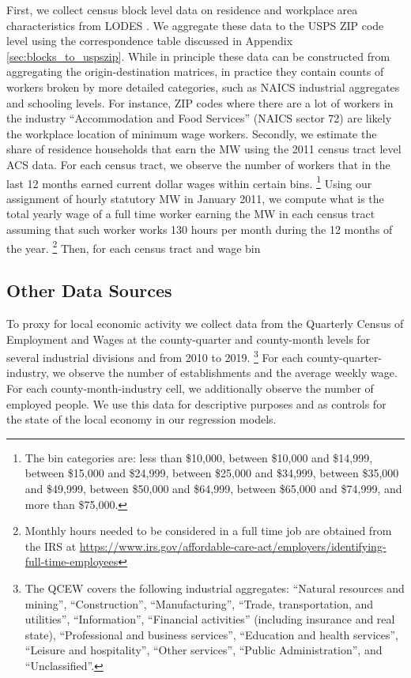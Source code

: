 First, we collect census block level data on residence and workplace area 
characteristics from LODES \parencite{CensusLODES}.
We aggregate these data to the USPS ZIP code level using the correspondence
table discussed in Appendix \ref{sec:blocks_to_uspszip}.
While in principle these data can be constructed from aggregating the 
origin-destination matrices, in practice they contain counts of workers broken
by more detailed categories, such as NAICS industrial aggregates and 
schooling levels.
For instance, ZIP codes where there are a lot of workers in the industry 
``Accommodation and Food Services'' (NAICS sector 72) are likely the workplace
location of minimum wage workers.
Secondly, we estimate the share of residence households that earn the MW using the 2011 
census tract level ACS data. For each census tract, we observe the number of workers that in the 
last 12 months earned current dollar wages within certain bins.  \footnote{The bin categories are: 
less than \$10,000, between \$10,000 and \$14,999, between \$15,000 and \$24,999, 
between \$25,000 and \$34,999, between \$35,000 and \$49,999, between \$50,000 and \$64,999,
between \$65,000 and \$74,999, and more than \$75,000.} Using our assignment of hourly statutory MW 
in January 2011, we compute what is the total yearly wage of a full time worker earning the MW in each 
census tract assuming that such worker works 130 hours per month during the 12 months of the year. \footnote{
Monthly hours needed to be considered in a full time job are obtained from the IRS at
\url{https://www.irs.gov/affordable-care-act/employers/identifying-full-time-employees}} 
Then, for each census tract and wage bin
\subsection{Other Data Sources}\label{sec:data_other}

To proxy for local economic activity we collect data from the 
Quarterly Census of Employment and Wages \parencite[QCEW;][]{QCEW} 
at the county-quarter and county-month levels 
for several industrial divisions and from 2010 to 2019.%
\footnote{The QCEW covers the following industrial aggregates: 
``Natural resources and mining'', ``Construction'', ``Manufacturing'', 
``Trade, transportation, and utilities'', ``Information'', 
``Financial activities'' (including insurance and real state), 
``Professional and business services'', ``Education and health services'', 
``Leisure and hospitality'', ``Other services'', ``Public Administration'',
and ``Unclassified''.}
For each county-quarter-industry, we observe the number of establishments and the 
average weekly wage. For each county-month-industry cell, we additionally observe the number 
of employed people. We use this data for descriptive purposes and as controls for the 
state of the local economy in our regression models.

